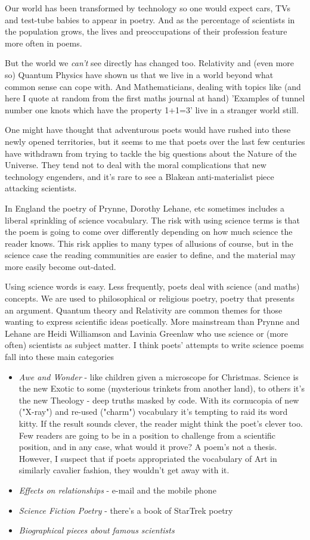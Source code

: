 \documentclass[11pt]{article}
\begin{document}
Our world has been transformed by technology so one would expect
cars, TVs and test-tube babies to appear in poetry. And as the
percentage of scientists in the population grows, the lives and
preoccupations of their profession feature more often in poems.

But the world we \textit{can't} see directly has changed too. Relativity
and (even more so) Quantum Physics have shown us that we live in a 
world beyond what common sense can cope with. And Mathematicians,
dealing with topics like (and here I quote at random from the first maths 
journal at hand)
'Examples of tunnel number one knots which have the property 1+1=3' live in a stranger world still.

One might have thought that adventurous poets would have rushed into
these newly opened territories, but it seems to me that poets over the last 
few centuries have withdrawn
from trying to tackle the big questions about the Nature of the Universe. 
They tend not to deal with the moral complications that new technology
engenders, and it's rare to see a Blakean anti-materialist piece attacking
scientists.

In England the poetry of Prynne, Dorothy Lehane, etc sometimes includes a liberal sprinkling of science vocabulary. The risk with using science terms is that the poem is going to come over differently depending on how much science the reader knows. This risk applies to many types of allusions of course, but in the science case the reading communities are easier to define, and the material may more easily become out-dated. 

Using science words is easy. Less frequently, poets deal with science (and maths) concepts. We are used to philosophical or religious poetry, poetry that presents an argument. Quantum theory and Relativity are common themes for those wanting to express scientific ideas poetically. More mainstream than Prynne and Lehane are Heidi Williamson and Lavinia Greenlaw who use science or (more often) scientists as subject matter. I think poets' attempts to write science poems fall into these 
main categories

\begin{itemize}
\item  \textit{Awe and Wonder} - like children given a microscope for
Christmas. Science is the new Exotic to some (mysterious trinkets from another land), to others it's the new Theology - deep truths masked by code. With its cornucopia of new ("X-ray") and re-used ("charm") vocabulary  it's tempting to raid its word kitty. If the result sounds clever, the reader might think the poet's clever too. Few readers are going to be in a position to challenge from a scientific position, and in any case, what would it prove? A poem's not a thesis. However, I suspect that if poets appropriated the vocabulary of Art in similarly cavalier fashion, they wouldn't get away with it.
\item  \textit{Effects on relationships} - e-mail and the mobile phone
\item  \textit{Science Fiction Poetry} - there's a book of StarTrek
poetry
\item  \textit{Biographical pieces about famous scientists}
\end{itemize}
\end{document}
